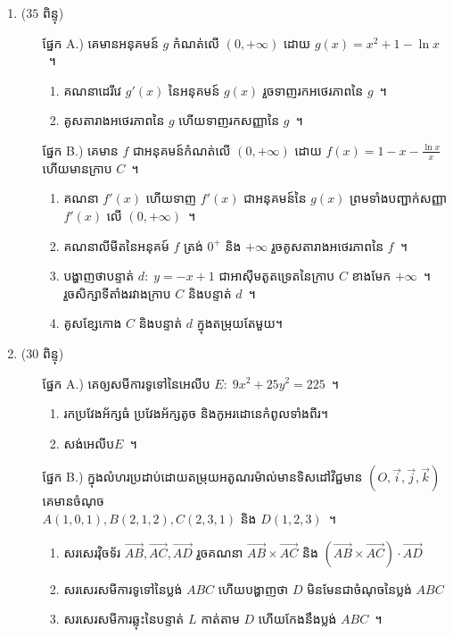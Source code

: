 \documentclass[12pt, legalpaper]{exam}
\begin{document}
\begin{enumerate}[I]
		\item ($ 35 $ ពិន្ទុ) 
		\begin{itemize}
			\item[ផ្នែក A.)] គេមានអនុគមន៍ $ g $ កំណត់លើ $ (0,+\infty) $ ដោយ $ g(x)=x^2+1-\ln x $~។
			\begin{enumerate}[a]
				\item គណនាដេរីវេ $ g'(x) $ នៃអនុគមន៍ $ g(x) $ រួចទាញរកអថេរភាពនៃ $ g $~។
				\item គូសតារាងអថេរភាពនៃ $ g $ ហើយទាញរកសញ្ញានៃ $ g $~។
			\end{enumerate}
			\item[ផ្នែក B.)] គេមាន $ f $ ជាអនុគមន៍កំណត់លើ $ (0,+\infty) $ ដោយ $ f(x)=1-x-\frac{\ln x}{x} $ ហើយមានក្រាប $ C $~។
			\begin{enumerate}[a]
				\item គណនា $ f'(x) $ ហើយទាញ $ f'(x) $ ជាអនុគមន៍នៃ $ g(x) $ ព្រមទាំងបញ្ជាក់សញ្ញា $ f'(x) $ លើ $ (0,+\infty) $~។
				\item គណនាលីមីត​នៃអនុគម៍ $ f $ ត្រង់ $ 0^+ $ និង $ +\infty $ រួចគូសតារាងអថេរភាពនៃ $ f $~។
				\item បង្ហាញថាបន្ទាត់ $ d:\;y=-x+1 $ ជាអាស៊ីមតូតទ្រេតនៃក្រាប $ C $ ខាងមែក $ +\infty $~។\\
				រួចសិក្សាទីតាំងរវាងក្រាប $ C $ និងបន្ទាត់ $ d $~។
				\item គូសខ្សែកោង $ C $ និងបន្ទាត់ $ d $ ក្នុងតម្រុយតែមួយ។
			\end{enumerate}
		\end{itemize}
		\item ($ 30 $ ពិន្ទុ) 
		\begin{itemize}
			\item[ផ្នែក A.)] គេឲ្យសមីការទូទៅនៃអេលីប $ E:\;9x^2+25y^2=225 $~។
			\begin{enumerate}[a]
				\item រកប្រវែងអ័ក្សធំ ប្រវែងអ័ក្សតូច និងកូអរដោនេកំពូលទាំងពីរ។
				\item សង់អេលីប​ $ E $~។
				\newpage
			\end{enumerate}
			\item[ផ្នែក B.)] ក្នុងលំហរប្រដាប់ដោយតម្រុយអតូណរម៉ាល់មានទិសដៅវិជ្ជមាន $ (O,\vec{i},\vec{j},\vec{k}) $ គេមានចំណុច​\\
			$ A(1,0,1),B(2,1,2),C(2,3,1) $ និង $ D(1,2,3) $~។
			\begin{enumerate}[a]
				\item សរសេរវ៉ិចទ័រ $ \overrightarrow{AB},\overrightarrow{AC},\overrightarrow{AD} $ រួចគណនា $ \overrightarrow{AB}\times\overrightarrow{AC} $ និង $ (\overrightarrow{AB}\times\overrightarrow{AC})\cdot\overrightarrow{AD} $
				\item សរសេរសមីការទូទៅនៃប្លង់ $ ABC $ ហើយបង្ហាញថា $ D $ មិនមែនជាចំណុចនៃប្លង់ $ ABC $
				\item សរសេរសមីការឆ្លុះនៃបន្ទាត់ $ L $ កាត់តាម $ D $ ហើយកែងនឹងប្លង់ $ ABC $~។
			\end{enumerate}
		\end{itemize}
	\end{enumerate}
\end{document}
